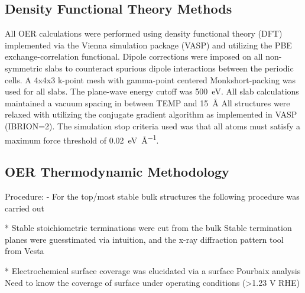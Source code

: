 \subsection{Density Functional Theory Methods}  %
%
%
All OER calculations were performed using density functional theory (DFT) implemented via the Vienna  simulation package (VASP)
\cite{Kresse1995,Kresse1996_0,Kresse1996_1}
and utilizing the PBE exchange-correlation functional\cite{Perdew1996}.
%
Dipole corrections were imposed on all non-symmetric slabs to counteract spurious dipole interactions between the periodic cells.\cite{Neugebauer1992}
A 4x4x3 k-point mesh with gamma-point centered Monkshort-packing\cite{Monkhorst1976} was used for all slabs.
%
The plane-wave energy cutoff was \SI{500}{\electronvolt}.
All slab calculations maintained a vacuum spacing in between TEMP and \SI{15}{\angstrom}
%
All structures were relaxed with utilizing the conjugate gradient algorithm as implemented in VASP (IBRION\num{=2}).
%
The simulation stop criteria used was that all atoms must satisfy a maximum force threshold of \SI{0.02}{\electronvolt\per\angstrom}.



\subsection{OER Thermodynamic Methodology}  %
%
Procedure:
- For the top/most stable bulk structures the following procedure was carried out

* Stable stoichiometric terminations were cut from the bulk Stable termination planes were guesstimated via intuition, and the x-ray diffraction pattern tool from Vesta

* Electrochemical surface coverage was elucidated via a surface Pourbaix analysis Need to know the coverage of surface under operating conditions (>1.23 V RHE)

